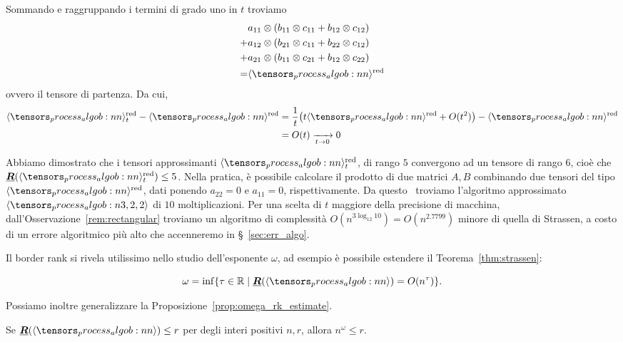 Sommando e raggruppando i termini di grado uno in $ t $ troviamo
\begin{equation*}
	\begin{aligned}
		  & a_{11}  \otimes (b_{11} \otimes c_{11} + b_{12} \otimes c_{12}) \\
		+ & a_{12}  \otimes (b_{21} \otimes c_{11} + b_{22} \otimes c_{12}) \\
		+ & a_{21}  \otimes (b_{11} \otimes c_{21} + b_{12} \otimes c_{22}) \\
		= & \algob{n}^\text{red}
	\end{aligned}
\end{equation*}
ovvero il tensore di partenza. Da cui,
\begin{equation*}
	\begin{aligned}
		\algob{n}_t^{\text{red}} - \algob{n}^{\text{red}} & = \frac{1}{t}\left( t\algob{n}^{\text{red}} +
		O(t^2)\right)- \algob{n}^{\text{red}}                                                             \\
		                                                  & = O(t) \xrightarrow[t \to 0]{} 0
	\end{aligned}
\end{equation*}

Abbiamo dimostrato che i tensori approssimanti $ \algob{n}_{t}^\text{red} $, di rango $ 5 $
convergono ad un tensore di rango $ 6 $, cioè che $ \brk(\algob{n}_{t}^\text{red}) \le 5 $. Nella pratica, è possibile calcolare il prodotto di due
matrici $ A,B $ combinando due tensori del tipo $ \algob{n}^\text{red}  $, dati ponendo $ a_{22}
	= 0 $ e $ a_{11} = 0 $, rispettivamente. Da questo~\cite{bini1979n2} troviamo
l'algoritmo approssimato $\algob{3,2,2}$ di $ 10 $ moltiplicazioni. Per una scelta di $ t $ maggiore della
precisione di macchina, dall'Osservazione~\ref{rem:rectangular} troviamo un algoritmo di complessità $ O(n^{3
			\log_{12}10}) = O(n^{2.7799}) $ minore di quella di Strassen, a costo di un errore algoritmico più alto
che accenneremo in \S~\ref{sec:err_algo}.

Il border rank si rivela utilissimo nello studio dell'esponente $ \omega $, ad esempio è possibile estendere il Teorema~\ref{thm:strassen}:
\begin{theorem}
	\begin{equation*}
		\omega = \inf \{\tau \in \R \mid \brk(\algob{n}) = O(n^\tau)\} .
	\end{equation*}
\end{theorem}
Possiamo inoltre generalizzare la Proposizione~\ref{prop:omega_rk_estimate}.
\begin{proposition}
	Se $ \brk(\algob{n}) \le r$ per degli interi positivi $ n,r $, allora $ n^\omega \le r $.
\end{proposition}

